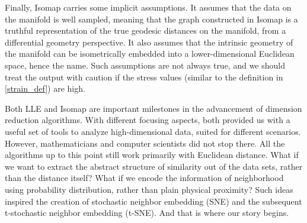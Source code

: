 Finally, Isomap carries some implicit assumptions. It assumes that the data on
the manifold is well sampled, meaning that the graph constructed in Isomap is a
truthful representation of the true geodesic distances on the manifold, from a
differential geometry perspective. It also assumes that the intrinsic geometry
of the manifold can be isometrically embedded into a lower-dimensional
Euclidean space, hence the name. Such assumptions are not always true, and we
should treat the output with caution if the stress values (similar to the
definition in \eqref{strain_def}) are high.

Both LLE and Isomap are important milestones in the advancement of dimension
reduction algorithms. With different focusing aspects, both provided us with a
useful set of tools to analyze high-dimensional data, suited for different
scenarios. However, mathematicians and computer scientists did not stop there.
All the algorithms up to this point still work primarily with Euclidean
distance. What if we want to extract the abstract structure of similarity out
of the data sets, rather than the distance itself? What if we encode the
information of neighborhood using probability distribution, rather than plain
physical proximity? Such ideas inspired the creation of stochastic neighbor
embedding (SNE) and the subsequent t-stochastic neighbor embedding (t-SNE). And
that is where our story begins.
